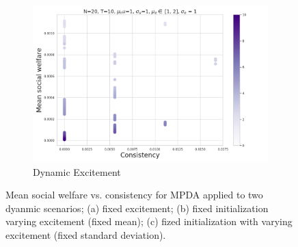 \begin{figure}
\begin{subfigure}[b]{0.49\textwidth}
         \includegraphics[width=\textwidth]{figures/mpda_dynamics_excitement_mean.png}
         \caption{Dynamic Excitement}
         \label{fig:excite_mean}
     \end{subfigure}
     \caption{Mean social welfare vs. consistency for MPDA applied to two dyanmic scenarios; (a) fixed excitement; (b) fixed initialization varying excitement (fixed mean); (c) fized initialization with varying excitement (fixed standard deviation).}
    \label{fig:mpda_dynamics}
\end{figure}
